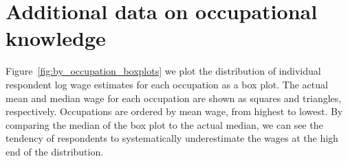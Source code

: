 \documentclass[11pt]{article}
\begin{document}

\section{Additional data on occupational knowledge} \label{sec:additional}

Figure~\ref{fig:by_occupation_boxplots} we plot the distribution of individual respondent log wage estimates for each occupation as a box plot. 
The actual mean and median wage for each occupation are shown as squares and triangles, respectively. 
Occupations are ordered by mean wage, from highest to lowest. 
By comparing the median of the box plot to the actual median, we can see the tendency of respondents to systematically underestimate the wages at the high end of the distribution.
\end{document}
